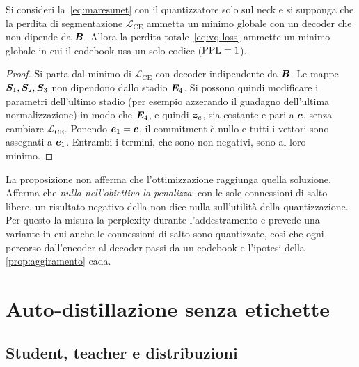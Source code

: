 \begin{proposizione}
\label{prop:aggiramento}
Si consideri la~\eqref{eq:maresunet} con il quantizzatore solo sul neck e si supponga che la
perdita di segmentazione $\mathcal{L}_{\mathrm{CE}}$ ammetta un minimo globale con un decoder
che non dipende da $\bm{B}$. Allora la perdita totale~\eqref{eq:vq-loss} ammette un minimo
globale in cui il codebook usa un solo codice ($\operatorname{PPL}=1$).
\end{proposizione}
\begin{proof}
Si parta dal minimo di $\mathcal{L}_{\mathrm{CE}}$ con decoder indipendente da $\bm{B}$. Le
mappe $\bm{S}_1,\bm{S}_2,\bm{S}_3$ non dipendono dallo stadio $\bm{E}_4$. Si possono
quindi modificare i parametri dell'ultimo stadio (per esempio azzerando il guadagno dell'ultima
normalizzazione) in modo che $\bm{E}_4$, e quindi $\bm{z}_e$, sia costante e pari a
$\bm{c}$, senza cambiare $\mathcal{L}_{\mathrm{CE}}$. Ponendo $\bm{e}_1=\bm{c}$, il
commitment è nullo e tutti i vettori sono assegnati a $\bm{e}_1$. Entrambi i termini, che sono
non negativi, sono al loro minimo.
\end{proof}

La proposizione non afferma che l'ottimizzazione raggiunga quella soluzione. Afferma che
\emph{nulla nell'obiettivo la penalizza}: con le sole connessioni di salto libere, un risultato
negativo della \maresunetvq{} non dice nulla sull'utilità della quantizzazione. Per questo la
 misura la perplexity durante l'addestramento e prevede una variante in cui anche le
connessioni di salto sono quantizzate, così che ogni percorso dall'encoder al decoder passi da
un codebook e l'ipotesi della \cref{prop:aggiramento} cada.

\section{Auto-distillazione senza etichette}
\label{sec:dino}

\subsection{Student, teacher e distribuzioni}

